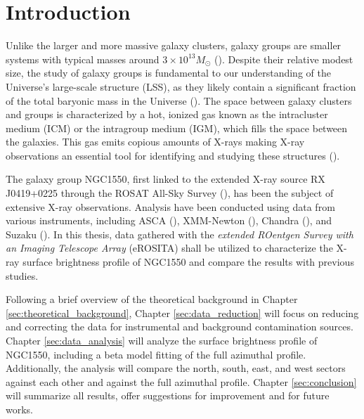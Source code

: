 
\chapter{Introduction}
\label{sec:intro}
Unlike the larger and more massive galaxy clusters, galaxy groups are smaller systems with typical masses around \(3 \times 10^{13} M_{\odot}\) (\cite{Schneider_2006}). Despite their relative modest size, the study of galaxy groups is fundamental to our understanding of the Universe's large-scale structure (LSS), as they likely contain a significant fraction of the total baryonic mass in the Universe (\cite{Peebles1998}). The space between galaxy clusters and groups is characterized by a hot, ionized gas known as the intracluster medium (ICM) or the intragroup medium (IGM), which fills the space between the galaxies. This gas emits copious amounts of X-rays making X-ray observations an essential tool for identifying and studying these structures (\cite{KravtsovBorgani2012}).

The galaxy group NGC1550, first linked to the extended X-ray source RX J0419+0225 through the ROSAT All-Sky Survey (\cite{Bohringer_2000}), has been the subject of extensive X-ray observations. Analysis have been conducted using data from various instruments, including ASCA (\cite{Kawaharada_2003}), XMM-Newton (\cite{Kawaharada_2009}), Chandra (\cite{Sun_2003}), and Suzaku (\cite{Sato_2010}). In this thesis, data gathered with the \textit{extended ROentgen Survey with an Imaging Telescope Array} (eROSITA) shall be utilized to characterize the X-ray surface brightness profile of NGC1550 and compare the results with previous studies.

Following a brief overview of the theoretical background in Chapter \ref{sec:theoretical_background}, Chapter \ref{sec:data_reduction} will focus on reducing and correcting the data for instrumental and background contamination sources. Chapter \ref{sec:data_analysis} will analyze the surface brightness profile of NGC1550, including a beta model fitting of the full azimuthal profile. Additionally, the analysis will compare the north, south, east, and west sectors against each other and against the full azimuthal profile. Chapter \ref{sec:conclusion} will summarize all results, offer suggestions for improvement and for future works.